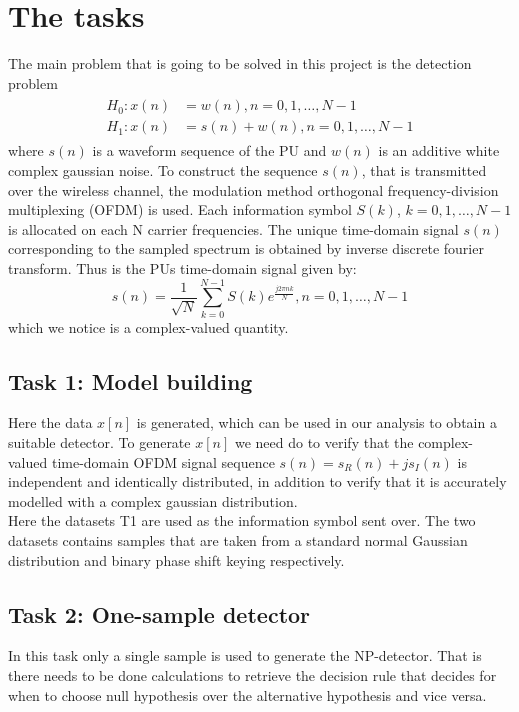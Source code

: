 \section{The tasks}\label{sec:task}
The main problem that is going to be solved in this project is the detection problem
\begin{align}
\begin{split}
	H_0: x(n) & = w(n), n = 0, 1, \dots, N-1\\
	H_1: x(n) & = s(n) + w(n), n = 0, 1, \dots, N-1
\end{split}
\end{align}\label{eq:detection_problem}
where $s(n)$ is a waveform sequence of the PU and $w(n)$ is an additive white complex gaussian noise.
To construct the sequence $s(n)$, that is transmitted over the wireless channel, the modulation method orthogonal frequency-division multiplexing (OFDM) is used. Each information symbol $S(k)$, $k=0,1,\dots,N-1$ is allocated on each N carrier frequencies. The unique time-domain signal $s(n)$ corresponding to the sampled spectrum is obtained by inverse discrete fourier transform. Thus is the PUs time-domain signal given by:
\begin{equation}
	s(n) = \frac{1}{\sqrt{N}}\sum_{k=0}^{N-1}S(k)e^{\frac{j2\pi nk}{N}}, n = 0,1,\dots,N-1
\end{equation}
which we notice is a complex-valued quantity.

\subsection{Task 1: Model building}
Here the data $x[n]$ is generated, which can be used in our analysis to obtain a suitable detector. To generate $x[n]$ we need do to verify that the complex-valued time-domain OFDM signal sequence $s(n) = s_R(n)+js_I(n)$ is independent and identically distributed, in addition to verify that it is accurately modelled with a complex gaussian distribution.\\
Here the datasets T1 are used as the information symbol sent over. The two datasets contains samples that are taken from a standard normal Gaussian distribution and binary phase shift keying respectively.

\subsection{Task 2: One-sample detector}
In this task only a single sample is used to generate the NP-detector. That is there needs to be done calculations to retrieve the decision rule that decides for when to choose null hypothesis over the alternative hypothesis and vice versa.

